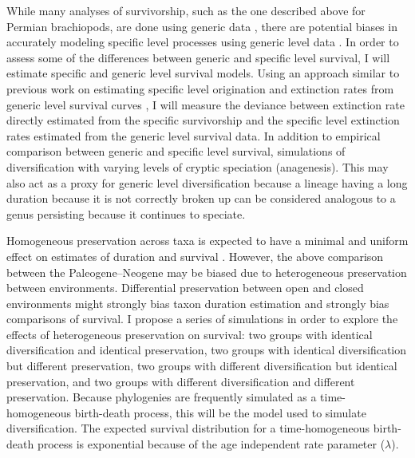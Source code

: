 \documentclass[12pt,letterpaper]{article}
\begin{document}
While many analyses of survivorship, such as the one described above for Permian brachiopods, are done using generic data \citep{Tomiya2013,Liow2008,Harnik2013}, there are potential biases in accurately modeling specific level processes using generic level data \citep{Raup1975,Sepkoski1975,Simpson2006,Raup1991a,VanValen1979}. In order to assess some of the differences between generic and specific level survival, I will estimate specific and generic level survival models. Using an approach similar to previous work on estimating specific level origination and extinction rates from generic level survival curves \citep{Foote1988}, I will measure the deviance between extinction rate directly estimated from the specific survivorship and the specific level extinction rates estimated from the generic level survival data. In addition to empirical comparison between generic and specific level survival, simulations of diversification with varying levels of cryptic speciation (anagenesis). This may also act as a proxy for generic level diversification because a lineage having a long duration because it is not correctly broken up can be considered analogous to a genus persisting because it continues to speciate.

Homogeneous preservation across taxa is expected to have a minimal and uniform effect on estimates of duration and survival \citep{Sepkoski1975}. However, the above comparison between the Paleogene--Neogene may be biased due to heterogeneous preservation between environments. Differential preservation between open and closed environments might strongly bias taxon duration estimation and strongly bias comparisons of survival. I propose a series of simulations in order to explore the effects of heterogeneous preservation on survival: two groups with identical diversification and identical preservation, two groups with identical diversification but different preservation, two groups with different diversification but identical preservation, and two groups with different diversification and different preservation. Because phylogenies are frequently simulated as a time-homogeneous birth-death process, this will be the model used to simulate diversification. The expected survival distribution for a time-homogeneous birth-death process is exponential because of the age independent rate parameter (\(\lambda\)). 
\end{document}
